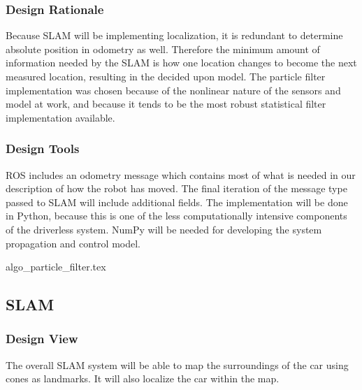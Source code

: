 \documentclass[10pt, onecolumn, draftclsnofoot, letterpaper,compsoc]{IEEEtran}
\begin{document}
\subsubsection{Design Rationale} %
Because SLAM will be implementing localization, it is redundant to determine absolute position in odometry as well. Therefore the minimum amount of information needed by the SLAM is how one location changes to become the next measured location, resulting in the decided upon model. The particle filter implementation was chosen because of the nonlinear nature of the sensors and model at work, and because it tends to be the most robust statistical filter implementation available. 

\subsubsection{Design Tools} %
ROS includes an odometry message which contains most of what is needed in our description of how the robot has moved. The final iteration of the message type passed to SLAM will include additional fields. The implementation will be done in Python, because this is one of the less computationally intensive components of the driverless system. NumPy will be needed for developing the system propagation and control model.

\begin{algorithm}
\caption{Particle Filter}
\label{alg:particleFilter}
\begin{algorithmic}[1]
{algo_particle_filter.tex}
\end{algorithmic}
\end{algorithm}

\newpage


\subsection{SLAM}
\subsubsection{Design View}
The overall SLAM system will be able to map the surroundings of the car using cones as landmarks. It will also localize the car within the map. 
\end{document}
